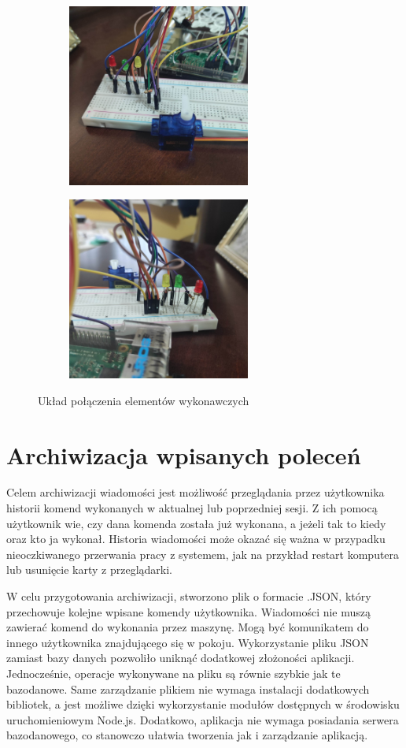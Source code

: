 \begin{figure}[h]
\begin{subfigure}{0.5\textwidth}
\includegraphics[width=0.9\linewidth, height=6cm]{"obrazy/ukladpolaczenia3"} 

\end{subfigure}
\begin{subfigure}{0.5\textwidth}
\includegraphics[width=0.9\linewidth, height=6cm]{"obrazy/ukladpolaczenia2"}

\end{subfigure}

\caption{Układ połączenia elementów wykonawczych}
\label{fig49}
\end{figure}
\newpage
\section{Archiwizacja wpisanych poleceń}
Celem archiwizacji wiadomości jest możliwość przeglądania przez użytkownika historii komend wykonanych w aktualnej lub poprzedniej sesji. Z ich pomocą użytkownik wie, czy dana komenda została już wykonana, a jeżeli tak to kiedy oraz kto ja wykonał. Historia wiadomości może okazać się ważna w przypadku nieoczkiwanego przerwania pracy z systemem, jak na przykład restart komputera lub usunięcie karty z przeglądarki.

W celu przygotowania archiwizacji, stworzono plik o formacie .JSON, który przechowuje kolejne wpisane komendy użytkownika. Wiadomości nie muszą zawierać komend do wykonania przez maszynę. Mogą być komunikatem do innego użytkownika znajdującego się w pokoju. Wykorzystanie pliku JSON zamiast bazy danych pozwoliło uniknąć dodatkowej złożoności aplikacji. Jednocześnie, operacje wykonywane na pliku są równie szybkie jak te bazodanowe. Same zarządzanie plikiem nie wymaga instalacji dodatkowych bibliotek, a jest możliwe dzięki wykorzystanie modułów dostępnych w środowisku uruchomieniowym Node.js. Dodatkowo, aplikacja nie wymaga posiadania serwera bazodanowego, co stanowczo ułatwia tworzenia jak i zarządzanie aplikacją.


